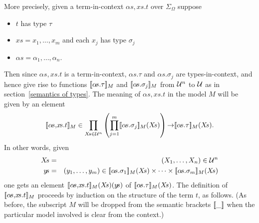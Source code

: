 More precisely, given a term-in-context $\alpha\!s,\!x\!s.t$
over $\Sigma_{\Omega}$ suppose
\begin{itemize}

\item $t$ has type $\tau$

\item $x\!s=x_{1},\ldots,x_{m}$ and each $x_{j}$ has type $\sigma_{j}$

\item $\alpha\!s=\alpha_{1},\ldots,\alpha_{n}$.

\end{itemize}
Then since $\alpha\!s,\!x\!s.t$ is a term-in-context, $\alpha\!s.\tau$
and $\alpha\!s.\sigma_{j}$ are types-in-context, and hence give rise
to functions $[\![\alpha\!s.\tau]\!]_{M}$ and
$[\![\alpha\!s.\sigma_{j}]\!]_{M}$ from ${\cal U}^{n}$ to $\cal U$ as in
section~\ref{semantics of types}. The meaning of $\alpha\!s,\!x\!s.t$
in the model $M$ will be given by an element
\[
\den{\alpha\!s,\!x\!s.t}_{M} \in \prod_{X\!s\in{\cal U}^{n}}
\left(\prod_{j=1}^{m}\den{\alpha\!s.\sigma_{j}}_{M}(X\!s)\right)
\fun \den{\alpha\!s.\tau}_{M}(X\!s) .
\]
In other words, given
\begin{eqnarray*}
X\!s & = & (X_{1},\ldots,X_{n})\in{\cal U}^{n} \\
y\!s & = & (y_{1},\ldots,y_{m})\in\den{\alpha\!s.\sigma_{1}}_{M}(X\!s)
           \times\cdots\times \den{\alpha\!s.\sigma_{m}}_{M}(X\!s)
\end{eqnarray*}
one gets an element $[\![\alpha\!s,\!x\!s.t]\!]_{M}(X\!s)(y\!s)$ of
$[\![\alpha\!s.\tau]\!]_{M}(X\!s)$. The definition of
$[\![\alpha\!s,\!x\!s.t]\!]_{M}$ proceeds by induction on the structure of
the term $t$, as follows. (As before, the subscript $M$ will be dropped from
the semantic brackets $[\![ \_ ]\!]$ when the particular model involved is
clear from the context.)
